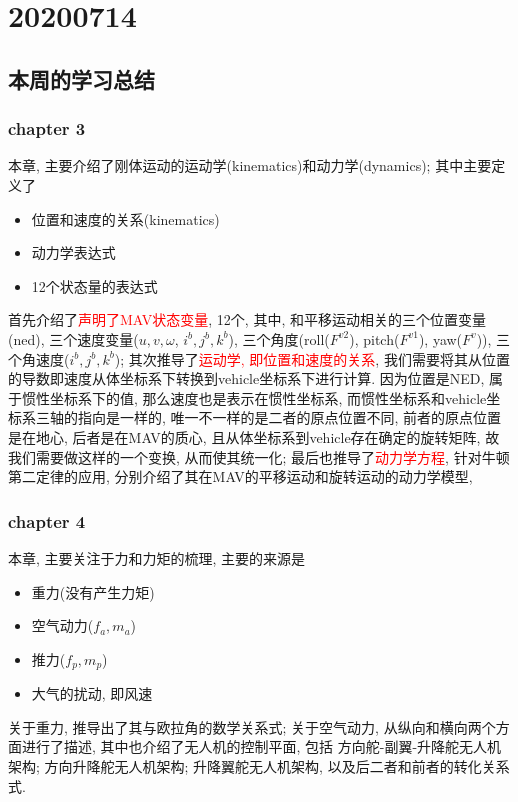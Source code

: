   \chapter{20200714}
    \section{本周的学习总结}
        \subsection{chapter 3}
        本章, 主要介绍了刚体运动的运动学(kinematics)和动力学(dynamics); 其中主要定义了
        \begin{itemize}
          \item 位置和速度的关系(kinematics)
          \item 动力学表达式
          \item 12个状态量的表达式
        \end{itemize}
        首先介绍了\textcolor{red}{声明了MAV状态变量}, 12个, 
        其中, 和平移运动相关的三个位置变量(ned), 
        三个速度变量($u, v, \omega$, $i^{b}, j^{b}, k^{b}$), 
        三个角度(roll($F^{v2}$), pitch($F^{v1}$), yaw($F^{v}$)), 
        三个角速度($i^{b}, j^{b}, k^{b}$); 
        其次推导了\textcolor{red}{运动学, 即位置和速度的关系}, 
        我们需要将其从位置的导数即速度从体坐标系下转换到vehicle坐标系下进行计算.  
        因为位置是NED, 属于惯性坐标系下的值, 那么速度也是表示在惯性坐标系, 而惯性坐标系和vehicle坐标系三轴的指向是一样的, 唯一不一样的是二者的原点位置不同, 前者的原点位置是在地心, 后者是在MAV的质心, 且从体坐标系到vehicle存在确定的旋转矩阵, 故我们需要做这样的一个变换, 从而使其统一化;
        最后也推导了\textcolor{red}{动力学方程}, 针对牛顿第二定律的应用, 分别介绍了其在MAV的平移运动和旋转运动的动力学模型,
        \subsection{chapter 4}
        本章, 主要关注于力和力矩的梳理, 主要的来源是
        \begin{itemize}
          \item 重力(没有产生力矩)
          \item 空气动力($f_{a}, m_{a}$)
          \item 推力($f_{p}, m_{p}$)
          \item 大气的扰动, 即风速
        \end{itemize}
        关于重力, 推导出了其与欧拉角的数学关系式; 关于空气动力, 从纵向和横向两个方面进行了描述, 其中也介绍了无人机的控制平面, 包括 方向舵-副翼-升降舵无人机架构; 方向升降舵无人机架构; 升降翼舵无人机架构, 以及后二者和前者的转化关系式. 
    \clearpage
